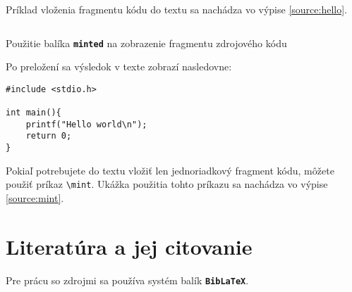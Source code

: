 Príklad vloženia fragmentu kódu do textu sa nachádza vo výpise \ref{source:hello}.


\begin{listing}[ht]
\inputminted[frame=lines]{latex}{examples/hello.world.tex}
\caption{Použitie balíka {\tt\bf minted} na zobrazenie fragmentu zdrojového kódu}\label{source:hello}
\end{listing}

Po preložení sa výsledok v texte zobrazí nasledovne:

\begin{verbatim}
#include <stdio.h>

int main(){
    printf("Hello world\n");
    return 0;
}
\end{verbatim}

Pokiaľ potrebujete do textu vložiť len jednoriadkový fragment kódu, môžete použiť príkaz {\tt\textbackslash{mint}}. Ukážka použitia tohto príkazu sa nachádza vo výpise \ref{source:mint}.


\section{Literatúra a jej citovanie}

Pre prácu so zdrojmi sa používa systém balík {\tt \bf BibLaTeX}.
\inputminted{latex}{chapters/bibliography.bib}
